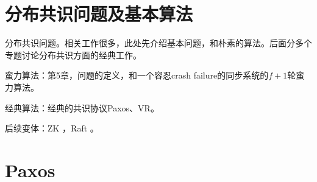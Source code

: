 

\chapter{分布共识问题及基本算法}

分布共识问题。相关工作很多，此处先介绍基本问题，和朴素的算法。后面分多个专题讨论分布共识方面的经典工作。

\myleaf 蛮力算法：\cite{Attiya04}第5章，问题的定义，和一个容忍crash failure的同步系统的$f+1$轮蛮力算法。

\myleaf 经典算法：经典的共识协议Paxos\cite{Lamport01}、VR\cite{Oki88}。

\myleaf 后续变体：ZK \cite{Junqueira11}，Raft \cite{Ongaro14}。


\chapter{Paxos}